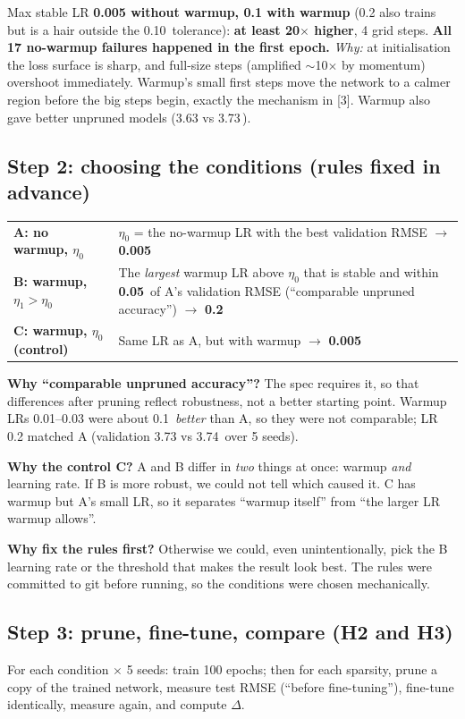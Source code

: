 \documentclass[11pt,a4paper]{article}
\newcommand{\A}{\,\text{\AA}}
\newcommand{\verdict}[1]{\fbox{\footnotesize\textbf{#1}}}
\begin{document}
\verdict{Strongly supported} Max stable LR \textbf{0.005 without warmup, 0.1 with warmup} (0.2 also trains but is a
hair outside the 0.10\A{} tolerance): \textbf{at least 20$\times$ higher}, 4 grid steps.
\textbf{All 17 no-warmup failures happened in the first epoch.} \emph{Why:} at initialisation the loss surface is sharp,
and full-size steps (amplified $\sim$10$\times$ by momentum) overshoot immediately. Warmup's small first steps move the
network to a calmer region before the big steps begin, exactly the mechanism in [3]. Warmup also gave better unpruned
models (3.63 vs 3.73\A).

\subsection{Step 2: choosing the conditions (rules fixed in advance)}
\begin{tabularx}{\linewidth}{@{}lY@{}}
\toprule
\textbf{A: no warmup, $\eta_0$} & $\eta_0$ = the no-warmup LR with the best validation RMSE $\to$ \textbf{0.005} \\
\textbf{B: warmup, $\eta_1 > \eta_0$} & The \emph{largest} warmup LR above $\eta_0$ that is stable and within \textbf{0.05\A} of A's validation RMSE (``comparable unpruned accuracy'') $\to$ \textbf{0.2} \\
\textbf{C: warmup, $\eta_0$ (control)} & Same LR as A, but with warmup $\to$ \textbf{0.005} \\
\bottomrule
\end{tabularx}

\textbf{Why ``comparable unpruned accuracy''?} The spec requires it, so that differences after pruning reflect robustness,
not a better starting point. Warmup LRs 0.01--0.03 were about 0.1\A{} \emph{better} than A, so they were not comparable;
LR 0.2 matched A (validation 3.73 vs 3.74\A{} over 5 seeds).

\textbf{Why the control C?} A and B differ in \emph{two} things at once: warmup \emph{and} learning rate. If B is more
robust, we could not tell which caused it. C has warmup but A's small LR, so it separates ``warmup itself'' from ``the
larger LR warmup allows''.

\textbf{Why fix the rules first?} Otherwise we could, even unintentionally, pick the B learning rate or the threshold that
makes the result look best. The rules were committed to git before running, so the conditions were chosen mechanically.

\subsection{Step 3: prune, fine-tune, compare (H2 and H3)}
For each condition $\times$ 5 seeds: train 100 epochs; then for each sparsity, prune a copy of the trained network,
measure test RMSE (``before fine-tuning''), fine-tune identically, measure again, and compute $\Delta$.
\end{document}
